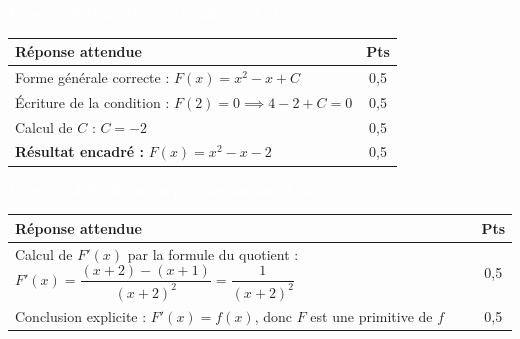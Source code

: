 \documentclass[10pt,a4paper]{article}
\newcommand{\exotitle}[2]{%
  \noindent\colorbox{exoheader}{%
    \parbox{\dimexpr\linewidth-2\fboxsep\relax}{%
      \textcolor{white}{\textbf{\large #1 \hfill #2}}%
    }%
  }%
}
\begin{document}
\vspace{4mm}

\exotitle{Exercice 3 \quad Primitive particulière}{/2 pts}

\vspace{1mm}

\begin{tabularx}{\linewidth}{|X|c|}
  \hline
  \rowcolor{exolight}
  \textbf{Réponse attendue} & \textbf{Pts} \\
  \hline
  Forme générale correcte : $F(x) = x^2 - x + C$ & 0,5 \\
  \hline
  Écriture de la condition : $F(2) = 0 \implies 4 - 2 + C = 0$ & 0,5 \\
  \hline
  Calcul de $C$ : $C = -2$ & 0,5 \\
  \hline
  \textbf{Résultat encadré :} $F(x) = x^2 - x - 2$ & 0,5 \\
  \hline
\end{tabularx}

\vspace{4mm}

\exotitle{Exercice 4 \quad Vérification par dérivation}{/1 pt}

\vspace{1mm}

\begin{tabularx}{\linewidth}{|X|c|}
  \hline
  \rowcolor{exolight}
  \textbf{Réponse attendue} & \textbf{Pts} \\
  \hline
  Calcul de $F'(x)$ par la formule du quotient :
  $F'(x) = \dfrac{(x+2)-(x+1)}{(x+2)^2} = \dfrac{1}{(x+2)^2}$ & 0,5 \\
  \hline
  Conclusion explicite : $F'(x) = f(x)$, donc $F$ est une primitive de $f$ & 0,5 \\
  \hline
\end{tabularx}
\end{document}

